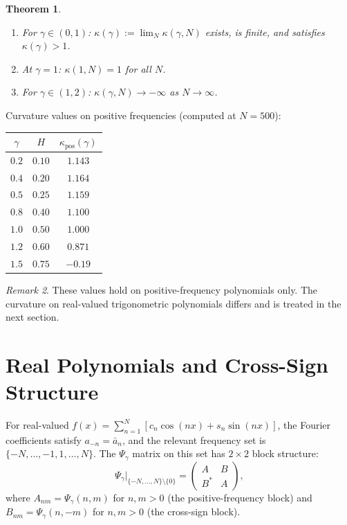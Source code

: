 \documentclass[11pt,a4paper]{article}
\theoremstyle{plain}
\newtheorem{theorem}{Theorem}[section]
\theoremstyle{definition}
\theoremstyle{remark}
\newtheorem{remark}[theorem]{Remark}
\begin{document}
\begin{theorem}\label{thm:phase-transition}
\begin{enumerate}[label=(\roman*)]
\item For $\gamma \in (0,1)$: $\kappa(\gamma) := \lim_N \kappa(\gamma,N)$
  exists, is finite, and satisfies $\kappa(\gamma) > 1$.
\item At $\gamma = 1$: $\kappa(1,N) = 1$ for all $N$.
\item For $\gamma \in (1,2)$: $\kappa(\gamma,N) \to -\infty$ as
  $N \to \infty$.
\end{enumerate}
\end{theorem}

Curvature values on positive frequencies (computed at $N=500$):

\medskip
\begin{center}
\begin{tabular}{ccc}
\toprule
$\gamma$ & $H$ & $\kappa_{\mathrm{pos}}(\gamma)$ \\
\midrule
$0.2$ & $0.10$ & $1.143$ \\
$0.4$ & $0.20$ & $1.164$ \\
$0.5$ & $0.25$ & $1.159$ \\
$0.8$ & $0.40$ & $1.100$ \\
$1.0$ & $0.50$ & $1.000$ \\
$1.2$ & $0.60$ & $0.871$ \\
$1.5$ & $0.75$ & $-0.19$ \\
\bottomrule
\end{tabular}
\end{center}

\begin{remark}\label{rem:pos-freq-only}
These values hold on positive-frequency polynomials only.
The curvature on real-valued trigonometric polynomials differs
and is treated in the next section.
\end{remark}


\section{Real Polynomials and Cross-Sign Structure}\label{sec:real}

For real-valued $f(x) = \sum_{n=1}^N [c_n\cos(nx) + s_n\sin(nx)]$,
the Fourier coefficients satisfy $a_{-n} = \bar{a}_n$, and the relevant
frequency set is $\{-N,\ldots,-1,1,\ldots,N\}$. The $\Psi_\gamma$ matrix
on this set has $2 \times 2$ block structure:
\begin{equation}\label{eq:block}
  \Psi_\gamma\Big|_{\{-N,\ldots,N\} \setminus \{0\}}
  = \begin{pmatrix} A & B \\ B^* & A \end{pmatrix},
\end{equation}
where $A_{nm} = \Psi_\gamma(n,m)$ for $n,m > 0$ (the positive-frequency
block) and $B_{nm} = \Psi_\gamma(n,-m)$ for $n,m > 0$ (the cross-sign
block).
\end{document}
